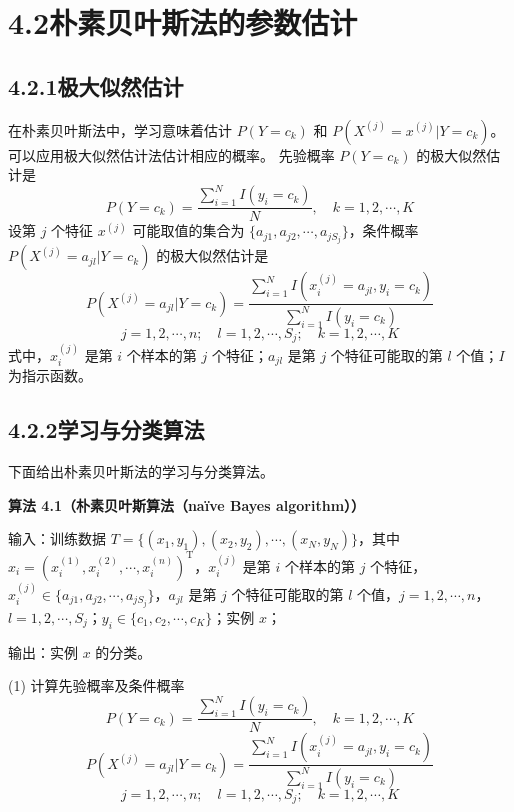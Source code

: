 \documentclass[UTF8, 12pt, fontset=fandol, oneside]{ctexart}
\begin{document}
\section*{4.2\quad 朴素贝叶斯法的参数估计}

\subsection*{4.2.1\quad 极大似然估计}

在朴素贝叶斯法中，学习意味着估计 $P(Y=c_k)$ 和 $P(X^{(j)}=x^{(j)}|Y=c_k)$。
可以应用极大似然估计法估计相应的概率。
先验概率 $P(Y=c_k)$ 的极大似然估计是
\begin{equation}
  P(Y=c_k)=\frac{\sum_{i=1}^N I(y_i=c_k)}{N},\quad k=1,2,\cdots,K
  \tag{4.8}
\end{equation}
设第 $j$ 个特征 $x^{(j)}$ 可能取值的集合为 $\{a_{j1},a_{j2},\cdots,a_{jS_j}\}$，条件概率 $P(X^{(j)}=a_{jl}|Y=c_k)$ 的极大似然估计是
\begin{equation}
  P(X^{(j)}=a_{jl}|Y=c_k)
  =
  \frac{\sum_{i=1}^N I(x_i^{(j)}=a_{jl},y_i=c_k)}
       {\sum_{i=1}^N I(y_i=c_k)}
\end{equation}
\[
  j=1,2,\cdots,n;\quad l=1,2,\cdots,S_j;\quad k=1,2,\cdots,K
  \tag{4.9}
\]
式中，$x_i^{(j)}$ 是第 $i$ 个样本的第 $j$ 个特征；$a_{jl}$ 是第 $j$ 个特征可能取的第 $l$ 个值；$I$ 为指示函数。

\subsection*{4.2.2\quad 学习与分类算法}

下面给出朴素贝叶斯法的学习与分类算法。

\noindent\textbf{算法 4.1（朴素贝叶斯算法（naïve Bayes algorithm））}

\noindent 输入：训练数据 $T=\{(x_1,y_1),(x_2,y_2),\cdots,(x_N,y_N)\}$，其中 $x_i=(x_i^{(1)},x_i^{(2)},\cdots,x_i^{(n)})^{\mathrm{T}}$，$x_i^{(j)}$ 是第 $i$ 个样本的第 $j$ 个特征，$x_i^{(j)}\in\{a_{j1},a_{j2},\cdots,a_{jS_j}\}$，$a_{jl}$ 是第 $j$ 个特征可能取的第 $l$ 个值，$j=1,2,\cdots,n$，$l=1,2,\cdots,S_j$；$y_i\in\{c_1,c_2,\cdots,c_K\}$；实例 $x$；

\noindent 输出：实例 $x$ 的分类。

(1) 计算先验概率及条件概率
\[
  P(Y=c_k)=\frac{\sum_{i=1}^N I(y_i=c_k)}{N},\quad k=1,2,\cdots,K
\]
\[
  P(X^{(j)}=a_{jl}|Y=c_k)
  =
  \frac{\sum_{i=1}^N I(x_i^{(j)}=a_{jl},y_i=c_k)}
       {\sum_{i=1}^N I(y_i=c_k)}
\]
\[
  j=1,2,\cdots,n;\quad l=1,2,\cdots,S_j;\quad k=1,2,\cdots,K
\]
\end{document}
